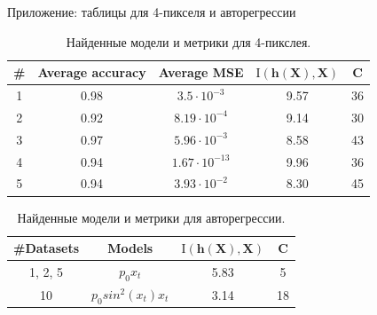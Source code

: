 \documentclass{beamer}
\begin{document}
\begin{frame}{Приложение: таблицы для 4-пикселя и авторегрессии}
    \begin{table}[ht!]
        \centering
        \begin{tabular}{|c|c|c|c|c|}
            \hline
             \# & Average accuracy & Average MSE  & \(\operatorname{I(\mathbf{h}(\mathbf{X}), \mathbf{X})}\) & C \\ \hline 
             1 & 0.98 & \(3.5 \cdot 10^{-3}\) & 9.57 & 36 \\
             2 & 0.92 & \(8.19 \cdot 10^{-4}\) & 9.14 & 30 \\
             3 & 0.97 & \(5.96 \cdot 10^{-3}\) & 8.58 & 43 \\
             4 & 0.94 & \(1.67 \cdot 10^{-13}\) & 9.96 & 36 \\
             5 & 0.94 & \(3.93 \cdot 10^{-2}\) & 8.30 & 45 \\ \hline
        \end{tabular}
        \caption{Найденные модели и метрики для 4-пикслея.}
        \label{4-pixels}
    \end{table}
    \begin{table}[ht!]\label{ar}
        \centering
        \begin{tabular}{|c|c|c|c|}
            \hline
             \#Datasets & Models & \(\operatorname{I(\mathbf{h}(\mathbf{X}), \mathbf{X})}\) & C \\ \hline 
             1, 2, 5 & \(p_0 x_t\) & 5.83 & 5 \\
             10 & \(p_0 sin^2(x_t)x_t\) &  3.14 & 18 \\ \hline
        \end{tabular}
        \caption{Найденные модели и метрики для авторегрессии.}
        \label{tab:my_label}
    \end{table}
\end{frame}
\end{document}
